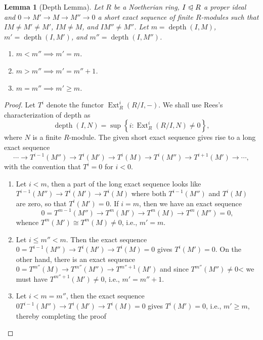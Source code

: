 \documentclass[10pt]{article}
\theoremstyle{thmstyle}
\newtheorem{lemma}[theorem]{Lemma}
\theoremstyle{defstyle}
\renewcommand{\le}{\leqslant}
\renewcommand{\ge}{\geqslant}
\newcommand{\Ext}{\operatorname{Ext}}
\newcommand{\noreq}{\trianglelefteqslant}
\newcommand{\depth}{\operatorname{depth}}
\begin{document}
\begin{lemma}[Depth Lemma]
    Let $R$ be a Noetherian ring, $I\noreq R$ a proper ideal and $0\to M'\to M\to M''\to 0$ a short exact sequence of finite $R$-modules such that $IM\ne M'\ne M'$, $IM\ne M$, and $IM''\ne M''$. Let $m = \depth(I, M)$, $m' = \depth(I, M')$, and $m'' = \depth(I, M'')$.
    \begin{enumerate}[label=(\arabic*)]
        \item $m < m''\implies m' = m$. 
        \item $m > m''\implies m' = m'' + 1$. 
        \item $m = m''\implies m'\ge m$.
    \end{enumerate}
\end{lemma}
\begin{proof}
Let $T^i$ denote the functor $\Ext^i_R(R/I, -)$. We shall use Rees's characterization of depth as 
\begin{equation*}
    \depth(I, N) = \sup\left\{i\colon\Ext^i_R(R/I, N)\ne 0\right\},
\end{equation*}
where $N$ is a finite $R$-module. The given short exact sequence gives rise to a long exact sequence 
\begin{equation*}
    \cdots\to T^{i - 1}(M'')\to T^i(M')\to T^i(M)\to T^i(M'')\to T^{i + 1}(M')\to\cdots,
\end{equation*}
with the convention that $T^i = 0$ for $i < 0$.
\begin{enumerate}[label=(\arabic*)]
    \item Let $i < m$, then a part of the long exact sequence looks like $T^{i - 1}(M'')\to T^i(M')\to T^i(M)$ where both $T^{i - 1}(M'')$ and $T^i(M)$ are zero, so that $T^i(M') = 0$. If $i = m$, then we have an exact sequence 
    \begin{equation*}
        0 = T^{m - 1}(M'')\to T^m(M')\to T^m(M)\to T^m(M'') = 0,
    \end{equation*}
    whence $T^{m}(M')\cong T^m(M)\ne 0$, i.e., $m' = m$. 

    \item Let $i\le m'' < m$. Then the exact sequence $0 = T^{i - 1}(M'')\to T^i(M')\to T^i(M) = 0$ gives $T^i(M') = 0$. On the other hand, there is an exact sequence $0 = T^{m''}(M)\to T^{m''}(M'')\to T^{m'' + 1}(M')$ and since $T^{m''}(M'')\ne 0$< we must have $T^{m'' + 1}(M')\ne 0$, i.e., $m' = m'' + 1$. 
    
    \item Let $i < m = m''$, then the exact sequence $0  T^{i - 1}(M'')\to T^i(M')\to T^i(M) = 0$ gives $T^i(M') = 0$, i.e., $m'\ge m$, thereby completing the proof \qedhere
\end{enumerate}
\end{proof}
    
\end{document}
